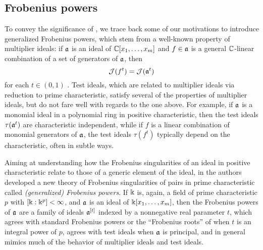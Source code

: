 \documentclass{amsart}
\begin{document}
\subsection{Frobenius powers}
To convey the significance of , we trace back some of our motivations to introduce generalized Frobenius powers, which stem from a well-known property of multiplier ideals:
if $\mathfrak{a}$ is an ideal of $\mathbb{C}[x_1,\ldots,x_m]$ and $f \in \mathfrak{a}$ is a general $\mathbb{C}$-linear combination of a set of generators of $\mathfrak{a}$, then
\[ \mathcal{J}(f^t) = \mathcal{J}(\mathfrak{a}^t)\]
for each $t \in (0,1)$ \cite[Proposition~9.2.28]{lazarsfeld.positivity-II}.
Test ideals, which are related to multiplier ideals via reduction to prime characteristic, satisfy several of the properties of multiplier ideals, but do not fare well with regards to the one above. 
For example, if $\mathfrak{a}$ is a monomial ideal in a polynomial ring in positive characteristic, then the test ideals $\tau(\mathfrak{a}^t)$ are characteristic independent, while if $f$ is a linear combination of monomial generators of $\mathfrak{a}$, the test ideals $\tau(f^t)$ typically depend on the characteristic, often in subtle ways.

Aiming at understanding how the Frobenius singularities of an ideal in positive characteristic relate to those of a generic element of the ideal, in \cite{hernandez+etal.frobenius_powers} the authors developed a new theory of Frobenius singularities of pairs in prime characteristic called \emph{\textup{(}generalized\textup{)} Frobenius powers}. 
If $\Bbbk$ is, again, a field of prime characteristic $p$ with $[\Bbbk:\Bbbk^p] <\infty$, and $\mathfrak{a}$ is an ideal of $\Bbbk[x_1, \ldots, x_m]$, then the Frobenius powers of $\mathfrak{a}$ are a family of ideals $\mathfrak{a}^{[t]}$ indexed by a nonnegative real parameter $t$, which agrees with standard Frobenius powers or the ``Frobenius roots'' of \cite{blickle+mustata+smith.discr_rat_FPTs} when $t$ is an integral power of $p$, agrees with test ideals when $\mathfrak{a}$ is principal, and in general mimics much of the behavior of multiplier ideals and test ideals.
\end{document}
